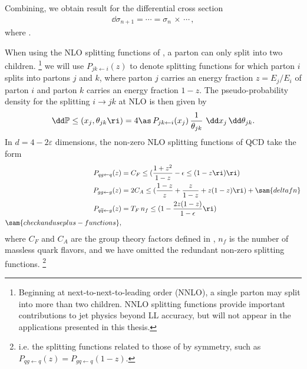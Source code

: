Combining, we obtain result for the differential cross section
\begin{subequations}
\begin{align}
    \dd \sigma_{n+1}
    =
    \cdots
    =
    \sigma_n
    \,
    \times
    \,
    \cdots
    \,,
\end{align}
\end{subequations}
where .

When using the NLO splitting functions of \Sec{}, a parton can only split into two children.%
\footnote{
    Beginning at next-to-next-to-leading order (NNLO), a single parton may split into more than two children.
    NNLO splitting functions provide important contributions to jet physics beyond LL accuracy, but will not appear in the applications presented in this thesis.
}
%
we will use \(P_{jk \leftarrow i}(z)\) to denote splitting functions for which parton \(i\) splits into partons \(j\) and \(k\), where parton \(j\) carries an energy fraction \(z = E_j / E_i\) of parton \(i\) and parton \(k\) carries an energy fraction \(1-z\).
%
%
The pseudo-probability density for the splitting \(i \to jk\) at NLO is then given by
\begin{align}
    \label{eq:splitting_probability}
    \dd\mathbb{P}\le(x_j, \theta_{jk}\ri)
    =
    4 \as
    \,
    P_{jk \leftarrow i}(x_j)
    \,
    \frac{1}{\theta_{jk}}
    \,\,
    \dd x_j
    \,
    \dd\theta_{jk}
    .
\end{align}
%
In \(d = 4 - 2\varepsilon\) dimensions, the non-zero NLO splitting functions of QCD take the form
\begin{subequations}
\label{eq:qcd_splitting_functions}
\begin{align}
    P_{qg\leftarrow q}(z)
    &=
    C_F \le(
        \frac{1 + z^2}{1-z} - \epsilon \le(1-z\ri)
    \ri)
    \\
    P_{gg \leftarrow g}(z)
    &=
    2C_A\le(
        \frac{1-z}{z}
        +
        \frac{z}{1-z}
        +
        z(1-z)
    \ri)
    +
    \sam{delta fn}
    \\
    P_{q \overline{q} \leftarrow g}(z)
    &=
    T_F \, n_f
    \le(
        1 - \frac{2z(1-z)}{1-\epsilon}
    \ri)
    \\
    \sam{check and use plus-functions}
    \notag
    ,
\end{align}
\end{subequations}
where \(C_F\) and \(C_A\) are the group theory factors defined in , \(n_f\) is the number of massless quark flavors, and we have omitted the redundant non-zero splitting functions.%
\footnote{
    i.e. the splitting functions related to those of  by symmetry, such as
    \(P_{qg\leftarrow q}(z) = P_{gq\leftarrow q}(1-z)\).
}


